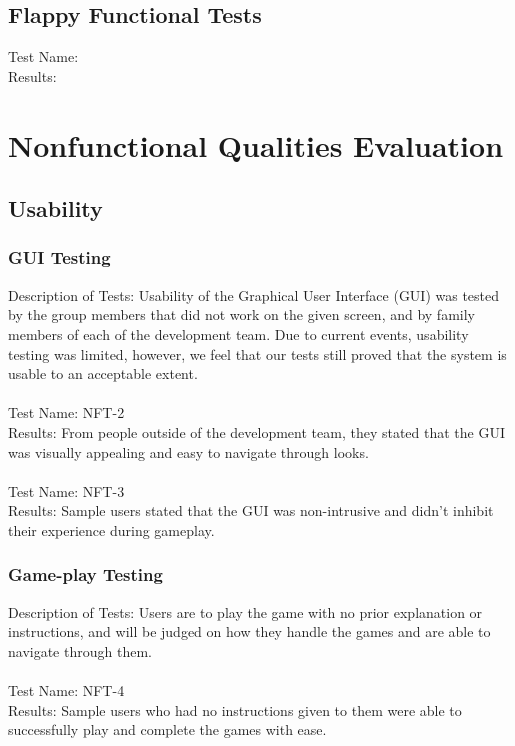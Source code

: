 \documentclass[12pt, titlepage]{article}
\begin{document}
\subsection{Flappy Functional Tests}
	Test Name: \\
	Results: \\
	
\section{Nonfunctional Qualities Evaluation} 

	\subsection{Usability}
	
	\subsubsection{GUI Testing}
	Description of Tests: Usability of the Graphical User Interface (GUI) was tested by the group members that did not work on the given screen, and by family members of each of the development team. Due to current events, usability testing was limited, however, we feel that our tests still proved that the system is usable to an acceptable extent.\\ \\
	Test Name: NFT-2\\
	Results: From people outside of the development team, they stated that the GUI was visually appealing and easy to navigate through looks.\\ \\
	Test Name: NFT-3\\
	Results: Sample users stated that the GUI was non-intrusive and didn't inhibit their experience during gameplay. \\
	
	\subsubsection{Game-play Testing}
	Description of Tests: Users are to play the game with no prior explanation or instructions, and will be judged on how they handle the games and are able to navigate through them. \\ \\
	Test Name: NFT-4 \\ 
	Results: Sample users who had no instructions given to them were able to successfully play and complete the games with ease. \\
	
\end{document}
